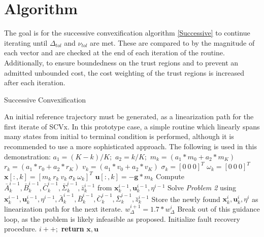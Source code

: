 \section{Algorithm}
The goal is for the successive convexification algorithm \ref{Successive} to continue iterating until $\Delta_{tol}$ and $\nu_{tol}$ are met. These are compared to by the magnitude of each vector and are checked at the end of each iteration of the routine. Additionally, to ensure boundedness on the trust regions and to prevent an admitted unbounded cost, the cost weighting of the trust regions is increased after each iteration.

\begin{algorithm}
\caption{Successive Convexification}\label{Successive}
\begin{algorithmic}[1]
\State An initial reference trajectory must be generated, as a linearization path for the first iterate of SCVx. In this prototype case, a simple routine which linearly spans many states from initial to terminal condition is performed, although it is recommended to use a more sophisticated approach. The following is used in this demonstration:
\State		$a_1 = (K-k)/K;$
\State		$	a_2 = k/K;$
\State		$	m_k = (a_1*m_0 + a_2*m_K)$
\State		$	r_k = (a_1*r_0 + a_2*r_K)$
\State		$	v_k = (a_1*v_0 + a_2*v_K)$
\State		$	\sigma_k = [0 \ 0 \ 0]^T$
\State		$	\omega_k = [0 \ 0 \ 0]^T$
\State		$	\mathbf{x}[:, k] = [m_k \ r_k \ v_k \ \sigma_k  \ \omega_k]^T$
\State		$	\mathbf{u}[:, k] = -\mathbf{g} * m_k$
\EndFor{}
\State Compute $\bar{A}_k^{i-1}, \bar{B}_k^{i-1}, \bar{C}_k^{i-1}, \bar{\Sigma}_k^{i-1}, \bar{z}_k^{i-1}$ from $\mathbf{x}_k^{i-1}, \mathbf{u}_k^{i-1}, \eta^{i-1}$
\State Solve \textit{Problem 2} using $\mathbf{x}_k^{i-1}, \mathbf{u}_k^{i-1}, \eta^{i-1}, \bar{A}_k^{i-1}, \bar{B}_k^{i-1}, \bar{C}_k^{i-1}, \bar{\Sigma}_k^{i-1}, \bar{z}_k^{i-1}$
\State Store the newly found $\mathbf{x}_k^{i}, \mathbf{u}_k^{i}, \eta^{i}$ as linearization path for the next iterate.
\State $w^{i+1}_\Delta = 1.7*w^{i}_\Delta$
\State Break out of this guidance loop, as the problem is likely infeasible as proposed.
\State Initialize fault recovery procedure.
\EndIf
\State $i++;$
\EndWhile 
\State \textbf{return} $\mathbf{x}, \mathbf{u}$
\EndProcedure
\end{algorithmic}
\end{algorithm}



